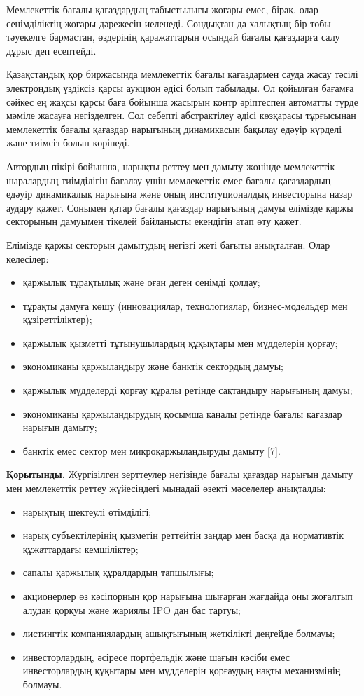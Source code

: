 Мемлекеттік бағалы қағаздардың табыстылығы жоғары емес, бірақ, олар
сенімділіктің жоғары дәрежесін иеленеді. Сондықтан да халықтың бір тобы
тәуекелге бармастан, өздерінің қаражаттарын осындай бағалы қағаздарға
салу дұрыс деп есептейді.

Қазақстандық қор биржасында мемлекеттік бағалы қағаздармен сауда жасау
тәсілі электрондық үздіксіз қарсы аукцион әдісі болып табылады. Ол
қойылған бағамға сәйкес ең жақсы қарсы баға бойынша жасырын контр
әріптеспен автоматты түрде мәміле жасауға негізделген. Сол себепті
абстрактілеу әдісі көзқарасы тұрғысынан мемлекеттік бағалы қағаздар
нарығының динамикасын бақылау едәуір күрделі және тиімсіз болып
көрінеді.

Автордың пікірі бойынша, нарықты реттеу мен дамыту жөнінде мемлекеттік
шаралардың тиімділігін бағалау үшін мемлекеттік емес бағалы қағаздардың
едәуір динамикалық нарығына және оның институционалдық инвесторына назар
аудару қажет. Сонымен қатар бағалы қағаздар нарығының дамуы елімізде
қаржы секторының дамуымен тікелей байланысты екендігін атап өту қажет.

Елімізде қаржы секторын дамытудың негізгі жеті бағыты анықталған. Олар
келесілер:

\begin{itemize}
\item
  қаржылық тұрақтылық және оған деген сенімді қолдау;
\item
  тұрақты дамуға көшу (инновациялар, технологиялар, бизнес-модельдер мен
  құзіреттіліктер);
\item
  қаржылық қызметті тұтынушылардың құқықтары мен мүдделерін қорғау;
\item
  экономиканы қаржыландыру және банктік сектордың дамуы;
\item
  қаржылық мүдделерді қорғау құралы ретінде сақтандыру нарығының дамуы;
\item
  экономиканы қаржыландырудың қосымша каналы ретінде бағалы қағаздар
  нарығын дамыту;
\item
  банктік емес сектор мен микроқаржыландыруды дамыту {[}7{]}.
\end{itemize}

{\bfseries Қорытынды.} Жүргізілген зерттеулер негізінде бағалы қағаздар
нарығын дамыту мен мемлекеттік реттеу жүйесіндегі мынадай өзекті
мәселелер анықталды:

\begin{itemize}
\item
  нарықтың шектеулі өтімділігі;
\item
  нарық субъектілерінің қызметін реттейтін заңдар мен басқа да
  нормативтік құжаттардағы кемшіліктер;
\item
  сапалы қаржылық құралдардың тапшылығы;
\item
  акционерлер өз кәсіпорнын қор нарығына шығарған жағдайда оны жоғалтып
  алудан қорқуы және жариялы IPO дан бас тартуы;
\item
  листингтік компаниялардың ашықтығының жеткілікті деңгейде болмауы;
\item
  инвесторлардың, әсіресе портфельдік және шағын кәсіби емес
  инвесторлардың құқытары мен мүдделерін қорғаудың нақты механизмінің
  болмауы.
\end{itemize}

